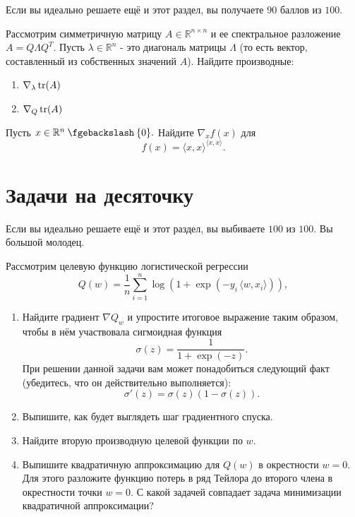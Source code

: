 \documentclass[12pt, a4paper, oneside]{article}
\newcommand{\mysetminus}{\mathbin{\fgebackslash}}
\begin{document}
Если вы идеально решаете ещё и этот раздел, вы получаете $90$ баллов из $100$.

\begin{problem}{10}
    Рассмотрим симметричную матрицу $A \in \mathbb{R}^{n \times n}$ и ее спектральное разложение $A = Q \Lambda Q^T$.
    Пусть $\lambda \in \mathbb{R}^n$ - это диагональ матрицы $\Lambda$ (то есть вектор, составленный из собственных значений $A$).
    Найдите производные:
    
    \begin{enumerate}
        \item $\nabla_{\lambda} \operatorname{tr}(A)$
        \item $\nabla_Q \operatorname{tr}(A)$
    \end{enumerate}
\end{problem}

\begin{problem}{10}
Пусть $x \in \RR^n \mysetminus \{0\}.$ Найдите $\nabla_x f(x)$ для \[f(x) = \langle x, x \rangle^{\langle x, x \rangle}.\]
\end{problem}


\section*{Задачи на десяточку}

Если вы идеально решаете ещё и этот раздел, вы выбиваете $100$ из $100$. Вы большой молодец. 

\begin{problem}{10}
    Рассмотрим целевую функцию логистической регрессии 
    \[
    Q(w) = \frac{1}{n} \sum_{i=1}^{n} \log (1 + \exp(-y_i \, \langle w, x_i\rangle)),
    \]
    
    \begin{enumerate} 
        \item Найдите градиент $\nabla Q_w$ и упростите итоговое выражение таким образом, чтобы в нём участвовала сигмоидная функция 
        $$\sigma(z) = \frac{1}{1 + \exp(-z)}.$$ При решении данной задачи вам может понадобиться следующий факт (убедитесь, что он действительно выполняется):
        $$\sigma'(z) = \sigma(z) (1- \sigma(z)).$$ 
        \item Выпишите, как будет выглядеть шаг градиентного спуска.
        \item Найдите вторую производную целевой функции по $w$.
        \item Выпишите квадратичную аппроксимацию для $Q(w)$ в окрестности $w=0$. Для этого разложите функцию потерь в ряд Тейлора до второго члена в окрестности точки $w=0$. С какой задачей совпадает задача минимизации квадратичной аппроксимации?
    \end{enumerate} 
\end{problem}
\end{document}
